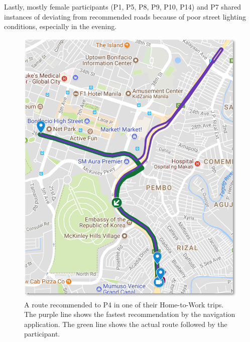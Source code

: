 Lastly, mostly female participants (P1, P5, P8, P9, P10, P14) and P7 shared instances of deviating from recommended roads because of poor street lighting conditions, especially in the evening. 

\begin{figure}[t]
  \centering
  \includegraphics[scale=0.6]{figures/s1-practical.png}
  \caption{A route recommended to P4 in one of their Home-to-Work trips. The purple line shows the fastest recommendation by the navigation application. The green line shows the actual route followed by the participant. }
  \label{fig:s1-practical}
\end{figure}

